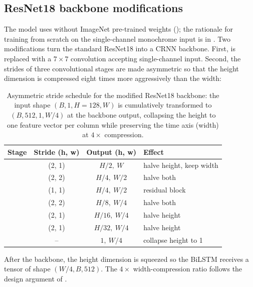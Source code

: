 \subsection{ResNet18 backbone modifications}

The model uses  without ImageNet
pre-trained weights (); the rationale
for training from scratch on the single-channel monochrome input is
in .
Two modifications turn the standard ResNet18 into a CRNN backbone.
First,  is replaced with a $7\times7$ convolution accepting
single-channel input.
Second, the strides of three convolutional stages are made asymmetric
so that the height dimension is compressed eight times more
aggressively than the width:

\begin{table}[ht]
\centering
\small
\setlength{\tabcolsep}{8pt}
\renewcommand{\arraystretch}{1.20}
\begin{tabularx}{0.85\textwidth}{@{} l c c L @{}}
\toprule
\textbf{Stage} & \textbf{Stride (h, w)} & \textbf{Output (h, w)} & \textbf{Effect} \\
\midrule
{}                  & (2, 1) & $H/2,\ W$    & halve height, keep width \\
                & (2, 2) & $H/4,\ W/2$  & halve both \\
                 & (1, 1) & $H/4,\ W/2$  & residual block \\
                 & (2, 2) & $H/8,\ W/4$  & halve both \\
                 & (2, 1) & $H/16,\ W/4$ & halve height \\
                 & (2, 1) & $H/32,\ W/4$ & halve height \\
      & --     & $1,\ W/4$    & collapse height to 1 \\
\bottomrule
\end{tabularx}
\caption{Asymmetric stride schedule for the modified ResNet18 backbone:
the input shape $(B, 1, H{=}128, W)$ is cumulatively transformed to
$(B, 512, 1, W/4)$ at the backbone output, collapsing the height to
one feature vector per column while preserving the time axis (width) at
$4\times$ compression.}
\label{tab:resnet-strides}
\end{table}

After the backbone, the height dimension is squeezed so the BiLSTM
receives a tensor of shape $(W/4, B, 512)$.
The $4\times$ width-compression ratio follows the design argument of
.

